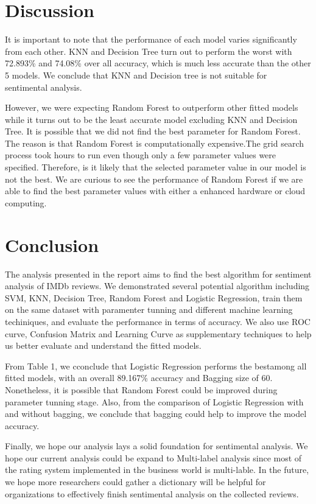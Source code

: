 \documentclass[10pt,twocolumn,letterpage]{article}
\begin{document}
	\section{Discussion}
	It is important to note that the performance of each model varies significantly from each other. KNN and Decision Tree turn out to perform the worst with 72.893\% and 74.08\% over all accuracy, which is much less accurate than the other 5 models. We conclude that KNN and Decision tree is not suitable for sentimental analysis. 

	However, we were expecting Random Forest to outperform other fitted models while it turns out to be the least accurate model excluding KNN and Decision Tree. It is possible that we did not find the best parameter for Random Forest. The reason is that Random Forest is computationally expensive.The grid search process took hours to run even though only a few parameter values were specified. Therefore, is it likely that the selected parameter value in our model is not the best. We are curious to see the performance of Random Forest if we are able to find the best parameter values with either a enhanced hardware or cloud computing.
	
\section{Conclusion}
	The analysis presented in the report aims to find the best algorithm for sentiment analysis of IMDb reviews. We demonstrated several potential algorithm including SVM, KNN, Decision Tree, Random Forest and Logistic Regression, train them on the same dataset with paramenter tunning and different machine learning techiniques, and evaluate the performance in terms of accuracy. We also use ROC curve, Confusion Matrix and Learning Curve as supplementary techniques to help us better evaluate and understand the fitted models.

	From Table 1, we cconclude that Logistic Regression performs the bestamong all fitted models, with an overall 89.167\% accuracy and Bagging size of 60. Nonetheless, it is possible that Random Forest could be improved during parameter tunning stage. Also, from the comparison of Logistic Regression with and without bagging, we conclude that bagging could help to improve the model accuracy.

	Finally, we hope our analysis lays a solid foundation for sentimental analysis. We hope our current analysis could be expand to Multi-label analysis since most of the rating system implemented in the business world is multi-lable. In the future, we hope more researchers could gather a dictionary will be helpful for organizations to effectively finish sentimental analysis on the collected reviews.
\end{document}
